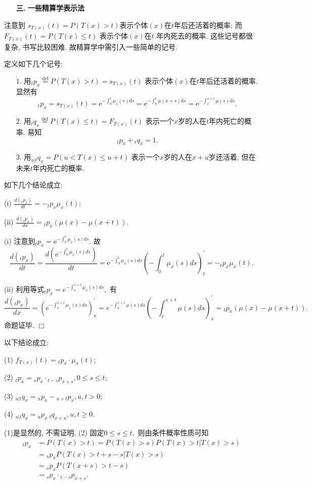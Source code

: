\documentclass[a4paper,openany, 10pt]{ctexbook}
\newcommand{\hei}{\CJKfamily{hei}}      %
\def\qed{\hfill$\Box$\medskip}
\def\z{\left}
\def\y{\right}
\begin{document}
\begin{itemize}
    \item[{\bf\hei 三.}]{\bf\hei 一些精算学表示法}
\end{itemize}
注意到 $ s_{T(x)}(t)=P(T(x)>t)$表示个体$ (x)$在$t$年后还活着的概率; 而$F_{T(x)}(t)=P(T(x)\le t)$ 表示个体$(x)$在$t$ 年内死去的概率. 这些记号都很复杂, 书写比较困难. 故精算学中需引入一些简单的记号.


定义如下几个记号:
\begin{enumerate}
    \item[$\mathring 1.$] 用$_tp_{x}\stackrel{\text{def}}{=}P(T(x)>t)=s_{T(x)}(t)$
        表示个体$(x)$在$t$年后还活着的概率. 显然有
        $$ {}_tp_x=s_{T(x)}(t)=\mathrm{e}^{-\int_{0}^{t}\mu_x(s)\mathrm{d}s}=\mathrm{e}^{-\int_{0}^{t}\mu(x+s)\mathrm{d}s}=\mathrm{e}^{-\int_{x}^{x+t}\mu(s)\mathrm{d}s}.$$
    \item[$\mathring 2.$] 用$_tq_{x}\stackrel{\text{def}}{=}P(T(x)\leq t)=F_{T(x)}(t)$
        表示一个$x$岁的人在$t$年内死亡的概率. 易知
        $$_tp_{x}+{}_tq_{x}=1.$$
    \item[$\mathring 3.$] 用$ _{u|t}q_x=P(u<T(x)\leq u+t)$
        表示一个$x$岁的人在$x+u$岁还活着, 但在未来$t$年内死亡的概率.
\end{enumerate}
\begin{proposition}如下几个结论成立:

    (i) $\frac{d(_tp_x)}{dt}=-_tp_x\mu_x(t);$

    (ii) $\frac{d(_tp_x)}{dx}= {}_tp_x(\mu(x)-\mu(x+t)).$


\end{proposition}

\proof (i) 注意到${}_tp_x=\mathrm{e}^{-\int_{0}^{t}\mu_x(s)ds}.$ 故
$$\frac{d(_tp_x)}{dt}=\frac{d(\mathrm{e}^{-\int_{0}^{t}\mu_x(s)ds})}{dt}=\mathrm{e}^{-\int_{0}^{t}\mu_x(s)ds}\z({-\int_{0}^{t}\mu_x(s)ds}\y)^{\prime}_t=-_tp_x\mu_x(t).$$

(ii) 利用等式${}_tp_x=e^{-\int_{x}^{x+t}\mu_x(s)ds},$ 有
$$\frac{d(_tp_x)}{dx}=\z(e^{-\int_{x}^{x+t}\mu_x(s)ds}\y)^{\prime}_x=e^{-\int_{x}^{x+t}\mu(s)ds}\z({-\int_{x}^{x+t}\mu(s)ds}\y)^{\prime}_x= {}_tp_x(\mu(x)-\mu(x+t)).$$
命题证毕.
\qed

\begin{proposition}以下结论成立:

    (1) $f_{T(x)}(t)={}_tp_x\cdot \mu_x(t);$

    (2) $_tp_x={}_sp_x\cdot{}_{t-s}p_{x+s},0\leq s\leq t;$

    (3) ${}_{u|t}q_x={}_up_x-{}_{u+t}p_x, u,t>0;$

    (4) ${}_{u|t}q_x={}_up_x~{}_{t}q_{x+u},u,t\ge0.$
\end{proposition}
\proof (1)是显然的, 不需证明. (2)
固定$0\le s\le t,$ 则由条件概率性质可知
\begin{align*}
    {}_tp_x & =P(T(x)>t)=P(T(x)>s)P(T(x)>t|T(x)>s) \\
            & ={}_sp_xP(T(x)>t+s-s|T(x)>s)         \\
            & ={}_sp_xP(T(x+s)>t-s)                \\
            & ={}_sp_x\cdot{}_{t-s}p_{x+s}.\end{align*}
\end{document}
